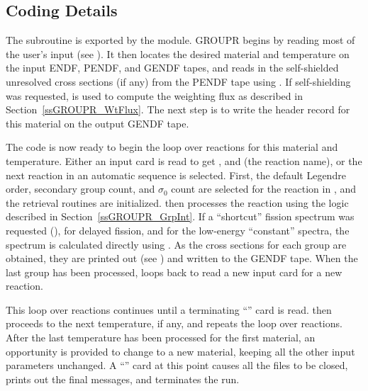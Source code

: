 \subsection{Coding Details}
\label{ssGROUPR_details}

The  subroutine is exported
by the  module.
GROUPR begins by reading most of the user's input (see
).  It then
locates the desired material and temperature on the input ENDF,
PENDF, and GENDF tapes, and reads in
the self-shielded unresolved cross sections (if any) from the PENDF
tape using .  If
self-shielding was requested, 
is used to compute the weighting flux as described in
Section~\ref{ssGROUPR_WtFlux}.  The
next step is to write the header record for this material on the
output GENDF tape.

The code is now ready to begin the loop over reactions for this
material and temperature.  Either an input card is read to
get ,  and  (the reaction name),
or the next reaction in
an automatic sequence is selected.  First, the default Legendre order,
secondary group count, and $\sigma_0$ count are selected for the reaction
in , and the retrieval routines are
initialized.   then processes the reaction using the
 logic described in
Section~\ref{ssGROUPR_GrpInt}.  If a ``shortcut'' fission
spectrum was requested (), for delayed fission, and
for the low-energy ``constant'' spectra, the spectrum is calculated
directly using .  As the cross
sections for each group are obtained, they are printed out
(see ) and written to the
GENDF tape.  When the last group has been processed, 
loops back to read a new input card for a new reaction.

This loop over reactions continues until a terminating ``'' card is
read.   then proceeds to the next temperature, if any, and
repeats the loop over reactions.  After the last temperature has been
processed for the first material, an opportunity is provided to change
to a new material, keeping all the other input parameters unchanged.
A ``'' card at this point causes all the files to be closed, prints
out the final messages, and terminates the  run.

